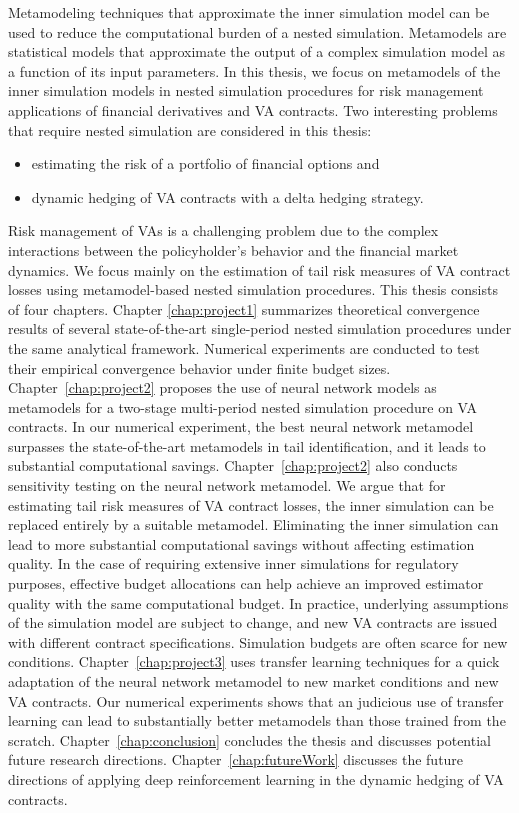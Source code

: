 Metamodeling techniques that approximate the inner simulation model can be used to reduce the computational burden of a nested simulation.
Metamodels are statistical models that approximate the output of a complex simulation model as a function of its input parameters.
In this thesis, we focus on metamodels of the inner simulation models in nested simulation procedures for risk management applications of financial derivatives and VA contracts.
Two interesting problems that require nested simulation are considered in this thesis:  
\begin{itemize}
    \item estimating the risk of a portfolio of financial options and 
    \item dynamic hedging of VA contracts with a delta hedging strategy.
\end{itemize}
Risk management of VAs is a challenging problem due to the complex interactions between the policyholder's behavior and the financial market dynamics.
We focus mainly on the estimation of tail risk measures of VA contract losses using metamodel-based nested simulation procedures.
This thesis consists of four chapters. 
Chapter \ref{chap:project1} summarizes theoretical convergence results of several state-of-the-art single-period nested simulation procedures under the same analytical framework. 
Numerical experiments are conducted to test their empirical convergence behavior under finite budget sizes.
Chapter~\ref{chap:project2} proposes the use of neural network models as metamodels for a two-stage multi-period nested simulation procedure on VA contracts. 
In our numerical experiment, the best neural network metamodel surpasses the state-of-the-art metamodels in tail identification, and it leads to substantial computational savings. 
Chapter~\ref{chap:project2} also conducts sensitivity testing on the neural network metamodel. 
We argue that for estimating tail risk measures of VA contract losses, the inner simulation can be replaced entirely by a suitable metamodel. 
Eliminating the inner simulation can lead to more substantial computational savings without affecting estimation quality. 
In the case of requiring extensive inner simulations for regulatory purposes, effective budget allocations can help achieve an improved estimator quality with the same computational budget.
In practice, underlying assumptions of the simulation model are subject to change, and new VA contracts are issued with different contract specifications.
Simulation budgets are often scarce for new conditions.
Chapter~\ref{chap:project3} uses transfer learning techniques for a quick adaptation of the neural network metamodel to new market conditions and new VA contracts.
Our numerical experiments shows that an judicious use of transfer learning can lead to substantially better metamodels than those trained from the scratch.
Chapter~\ref{chap:conclusion} concludes the thesis and discusses potential future research directions.
Chapter~\ref{chap:futureWork} discusses the future directions of applying deep reinforcement learning in the dynamic hedging of VA contracts.

